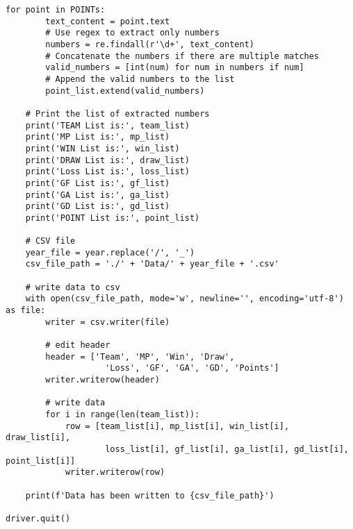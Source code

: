 \begin{lstlisting}[style=pystyle]
    for point in POINTs:
        text_content = point.text
        # Use regex to extract only numbers
        numbers = re.findall(r'\d+', text_content)
        # Concatenate the numbers if there are multiple matches
        valid_numbers = [int(num) for num in numbers if num]
        # Append the valid numbers to the list
        point_list.extend(valid_numbers)

    # Print the list of extracted numbers
    print('TEAM List is:', team_list)
    print('MP List is:', mp_list)
    print('WIN List is:', win_list)
    print('DRAW List is:', draw_list)
    print('Loss List is:', loss_list)
    print('GF List is:', gf_list)
    print('GA List is:', ga_list)
    print('GD List is:', gd_list)
    print('POINT List is:', point_list)

    # CSV file
    year_file = year.replace('/', '_')
    csv_file_path = './' + 'Data/' + year_file + '.csv'

    # write data to csv
    with open(csv_file_path, mode='w', newline='', encoding='utf-8') as file:
        writer = csv.writer(file)

        # edit header
        header = ['Team', 'MP', 'Win', 'Draw',
                    'Loss', 'GF', 'GA', 'GD', 'Points']
        writer.writerow(header)

        # write data
        for i in range(len(team_list)):
            row = [team_list[i], mp_list[i], win_list[i], draw_list[i],
                    loss_list[i], gf_list[i], ga_list[i], gd_list[i], point_list[i]]
            writer.writerow(row)

    print(f'Data has been written to {csv_file_path}')

driver.quit()

\end{lstlisting}